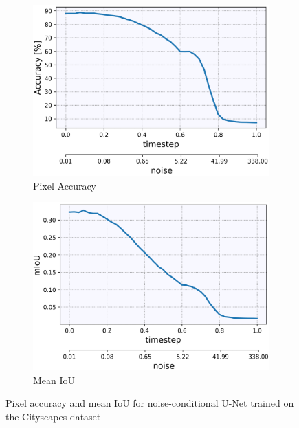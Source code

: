 \begin{figure}[] \label{fig:3.2}
    \centering
    \begin{subfigure}[b]{0.49\textwidth}
        \centering
         \includegraphics[width=\textwidth]{Chapters/figures/experiments/cityscapes/accuracy_cityscapes.PNG}
         \caption{Pixel Accuracy}
    \end{subfigure}
    \begin{subfigure}[b]{0.49\textwidth}
        \centering
         \includegraphics[width=\textwidth]{Chapters/figures/experiments/cityscapes/mIoU_cityscapes.PNG}
         \caption{Mean IoU}
    \end{subfigure}
    \caption[Pixel accuracy and mIoU for U-Net on Cityscapes dataset]{Pixel accuracy and mean IoU for noise-conditional U-Net trained on the Cityscapes dataset}
\end{figure}
